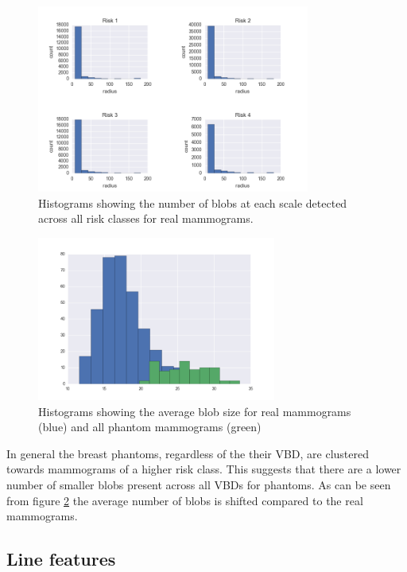 \begin{figure}[H]
	\label{fig:blob-risk-histogram}
	\centering
	\includegraphics[width=0.8\textwidth]{Images/blob-risk-histogram.png}	
	\caption{Histograms showing the number of blobs at each scale detected across all risk classes for real mammograms.}
\end{figure}

\begin{figure}[H]
	\label{fig:blob-both-dist-avg}
	\centering
	\includegraphics[width=0.7\textwidth]{Images/blob-both-dist-avg.png}	
	\caption{Histograms showing the average blob size for real mammograms (blue) and all phantom mammograms (green)}
\end{figure}

In general the breast phantoms, regardless of the their VBD, are clustered towards mammograms of a higher risk class. This suggests that there are a lower number of smaller blobs present across all VBDs for phantoms. As can be seen from figure \ref{fig:blob-both-dist-avg} the average number of blobs is shifted compared to the real mammograms.


\subsection{Line features}

